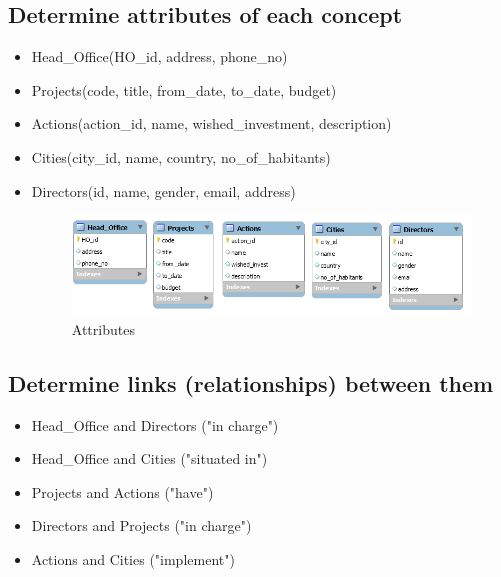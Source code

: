 \documentclass{article}
\begin{document}
\subsection{Determine attributes of each concept}
\begin{itemize}
	\item Head\_Office(HO\_id, address, phone\_no)
	\item Projects(code, title, from\_date, to\_date, budget)
	\item Actions(action\_id, name, wished\_investment, description)
	\item Cities(city\_id, name, country, no\_of\_habitants)
	\item Directors(id, name, gender, email, address)
\begin{figure}[h]
\centering
\includegraphics[scale = 0.9]{2.PNG}
\caption{Attributes}
\end{figure}
\end{itemize}

\subsection{Determine links (relationships) between them}
\begin{itemize}
	\item Head\_Office and Directors ("in charge")
	\item Head\_Office and Cities ("situated in")
	\item Projects and Actions ("have")
	\item Directors and Projects ("in charge")
	\item Actions and Cities ("implement")
	
	
\end{itemize}
\end{document}
